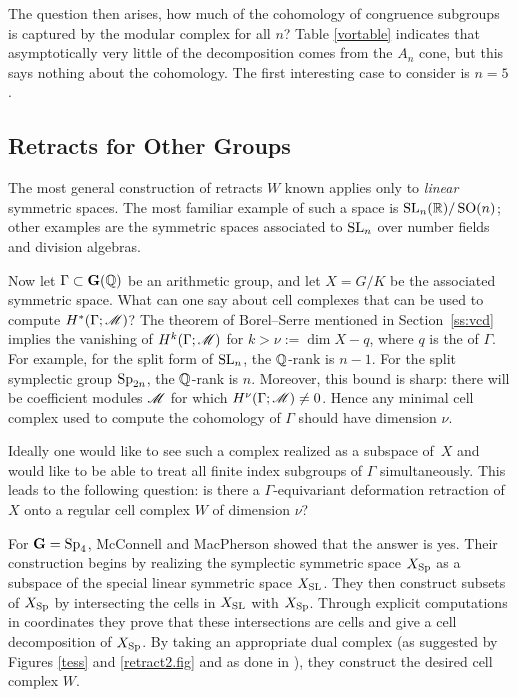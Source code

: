 The question then arises, how much of the cohomology of congruence
subgroups is captured by the modular complex for all $n$?  Table
\ref{vortable} indicates that asymptotically very little of the \Vor
decomposition comes from the $A_n$ cone, but this says nothing about
the cohomology.  The first interesting case to consider is $n=5$.


\subsection{Retracts for Other Groups}
%
The most general construction of retracts $W$ known \cite{ash.wrr}
applies only to \emph{linear} symmetric spaces.  
The most familiar
example of such a space is $\operatorname{SL}_{n} (\mathbb{R})/\operatorname{SO} (n)$; other examples are
the symmetric spaces associated to $\operatorname{SL}_{n}$ over number fields and
division algebras.

Now let $\Gamma\subset \mathbf{G} (\mathbb{Q} )$ be an arithmetic group, and let $X =
G/K$ be the associated symmetric space.  What can one say about cell
complexes that can be used to compute $H^{*} (\Gamma; \mathscr M)$?  The
theorem of Borel--Serre mentioned in Section~\ref{ss:vcd} implies the
vanishing of $H^{k}(\Gamma; \mathscr M )$ for $k>\nu := \dim X - q$, where
$q$ is the  of $\Gamma$.  For example, for the split
form of $\operatorname{SL}_{n}$, the $\mathbb{Q}$-rank is $n-1$.  For the split symplectic
group $\operatorname{Sp}_{2n}$, the $\mathbb{Q}$-rank is $n$.  Moreover, this bound is
sharp: there will be coefficient modules $\mathscr M$ for which $H^{\nu}
(\Gamma ; \mathscr M) \not = 0$.  Hence any minimal cell complex used to compute the
cohomology of $\Gamma$ should have dimension $\nu$. 

Ideally one would like to see such a complex realized as a subspace of~$X$ 
and would like to be able to treat all finite index subgroups of
$\Gamma $ simultaneously.  This leads to the following question: is
there a $\Gamma$-equivariant deformation retraction of $X$ onto a
regular cell complex $W$ of dimension $\nu$?

For $\mathbf{G} = \operatorname{Sp}_{4}$, McConnell and MacPherson showed that the answer is
yes.  Their construction begins by realizing the symplectic symmetric
space $X_{\operatorname{Sp}}$ as a subspace of the special linear symmetric space
$X_{\operatorname{SL}}$.  They then construct subsets of $X_{\operatorname{Sp}}$ by intersecting
the \Vor cells in $X_{\operatorname{SL}}$ with $X_{\operatorname{Sp}}$.  Through explicit
computations in coordinates they prove that these intersections are
cells and give a cell decomposition of $X_{\operatorname{Sp}}$.  By taking an
appropriate dual complex (as suggested by Figures \ref{tess} and
\ref{retract2.fig} and as done in \cite{ash77}), they construct the
desired cell complex $W$.

